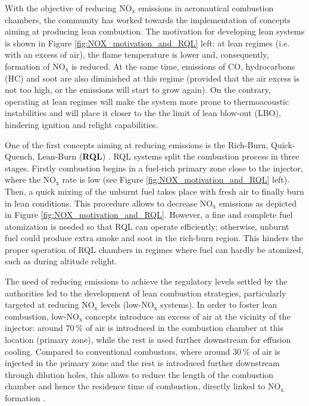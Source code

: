 
With the objective of reducing NO$_\mathrm{x}$ emissions in aeronautical combustion chambers, the community has worked towards the implementation of concepts aiming at producing lean combustion. The motivation for developing lean systems is shown in Figure \ref{fig:NOX_motivation_and_RQL} left: at lean regimes (i.e. with an excess of air), the flame temperature is lower and, consequently, formation of NO$_\mathrm{x}$ is reduced. At the same time, emissions of CO, hydrocarbons (HC) and soot are also diminished at this regime (provided that the air excess is not too high, or the emissions will start to grow again). On the contrary, operating at lean regimes will make the system more prone to thermoacoustic instabilities and will place it closer to the the limit of lean blow-out (LBO), hindering ignition and relight capabilities. 

One of the first concepts aiming at reducing emissions is the Rich-Burn, Quick-Quench, Lean-Burn (\textbf{RQL})  . RQL systems split the combustion process in three stages. Firstly combustion begins in a fuel-rich primary zone close to the injector, where the NO$_\mathrm{x}$ rate is low (see Figure \ref{fig:NOX_motivation_and_RQL} left). Then, a quick mixing of the unburnt fuel takes place with fresh air to finally burn in lean conditions. This procedure allows to decrease NO$_\mathrm{x}$ emissions as depicted in Figure \ref{fig:NOX_motivation_and_RQL}. However, a fine and complete fuel atomization is needed so that RQL can operate efficiently; otherwise, unburnt fuel could produce extra smoke and soot in the rich-burn region. This hinders the proper operation of RQL chambers in regimes where fuel can hardly be atomized, such as during altitude relight.

The need of reducing emissions to achieve the regulatory levels settled by the authorities led to the development of lean combustion strategies, particularly targeted at reducing NO$_\mathrm{x}$ levels (low-NO$_\mathrm{x}$ systems). In order to foster lean combustion, low-NO$_\mathrm{x}$ concepts introduce an excess of air at the vicinity of the injector: around $70 ~\%$ of air is introduced in the combustion chamber at this location (primary zone), while the rest is used further downstream for effusion cooling. Compared to conventional combustors, where around $30 ~\%$ of air is injected in the primary zone and the rest is introduced further downstream through dilution holes, this allows to reduce the length of the combustion chamber and hence the residence time of combustion, directly linked to NO$_\mathrm{x}$ formation . 


